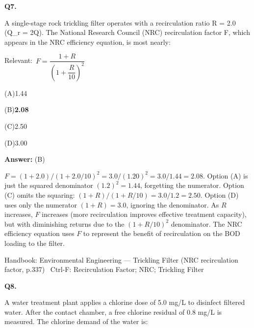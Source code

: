 \documentclass[11pt]{article}
\newcommand{\correct}[1]{\textbf{#1}\;{\color{accent}$\checkmark$}}
\newcommand{\optline}[2]{\par\noindent\hspace{1.2em}(#1)\hspace{0.6em}#2}
\begin{document}
\vspace{9pt}
\filbreak
\textbf{\color{accent}Q7.}\par\vspace{2pt}
A single-stage rock trickling filter operates with a recirculation ratio R = 2.0 (Q\_r = 2Q). The National Research Council (NRC) recirculation factor F, which appears in the NRC efficiency equation, is most nearly:\par\vspace{3pt}
{\small\color{soft}Relevant:}\ $F = \dfrac{1 + R}{\left(1 + \dfrac{R}{10}\right)^{2}}$\par\vspace{3pt}
\optline{A}{1.44}
\optline{B}{\correct{2.08}}
\optline{C}{2.50}
\optline{D}{3.00}
\par\vspace{3pt}
\vspace{2pt}\par\noindent\colorbox{boxbg}{\parbox{\dimexpr\linewidth-2\fboxsep\relax}{%
\vspace{2pt}\textbf{Answer:} (B)\par\vspace{2pt}
{\small $F = (1+2.0)/(1+2.0/10)^2 = 3.0/(1.20)^2 = 3.0/1.44 = 2.08$. Option (A) is just the squared denominator $(1.2)^2 = 1.44$, forgetting the numerator. Option (C) omits the squaring: $(1+R)/(1+R/10) = 3.0/1.2 = 2.50$. Option (D) uses only the numerator $(1+R) = 3.0$, ignoring the denominator. As $R$ increases, $F$ increases (more recirculation improves effective treatment capacity), but with diminishing returns due to the $(1+R/10)^2$ denominator. The NRC efficiency equation uses $F$ to represent the benefit of recirculation on the BOD loading to the filter.}\par\vspace{2pt}
{\footnotesize\color{soft}Handbook: Environmental Engineering --- Trickling Filter (NRC recirculation factor, p.337) \textbullet\ Ctrl-F: Recirculation Factor; NRC; Trickling Filter}\vspace{2pt}
}}
\vspace{9pt}
\filbreak
\textbf{\color{accent}Q8.}\par\vspace{2pt}
A water treatment plant applies a chlorine dose of 5.0 mg/L to disinfect filtered water. After the contact chamber, a free chlorine residual of 0.8 mg/L is measured. The chlorine demand of the water is:\par\vspace{3pt}
\end{document}
